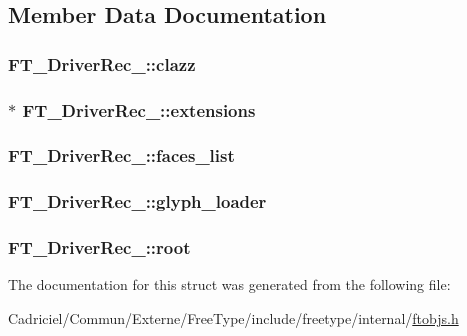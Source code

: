 \subsection{Member Data Documentation}
\hypertarget{struct_f_t___driver_rec___a3111153608e5abeb093ed5eb7fef5aec}{
\subsubsection[{clazz}]{ F\-T\-\_\-\-Driver\-Rec\-\_\-\-::clazz}}\label{struct_f_t___driver_rec___a3111153608e5abeb093ed5eb7fef5aec}
\hypertarget{struct_f_t___driver_rec___ad2f1c1a800723dc887dcbc7ce78203d8}{
\subsubsection[{extensions}]{$\ast$ F\-T\-\_\-\-Driver\-Rec\-\_\-\-::extensions}}\label{struct_f_t___driver_rec___ad2f1c1a800723dc887dcbc7ce78203d8}
\hypertarget{struct_f_t___driver_rec___a2602170e3ecde21a764dc32417aaa002}{
\subsubsection[{faces\-\_\-list}]{ F\-T\-\_\-\-Driver\-Rec\-\_\-\-::faces\-\_\-list}}\label{struct_f_t___driver_rec___a2602170e3ecde21a764dc32417aaa002}
\hypertarget{struct_f_t___driver_rec___ac28e7adbc14ee82c2b7710d0ee5541e2}{
\subsubsection[{glyph\-\_\-loader}]{ F\-T\-\_\-\-Driver\-Rec\-\_\-\-::glyph\-\_\-loader}}\label{struct_f_t___driver_rec___ac28e7adbc14ee82c2b7710d0ee5541e2}
\hypertarget{struct_f_t___driver_rec___a8451ceb25c76794fb47e81f477c8222d}{
\subsubsection[{root}]{ F\-T\-\_\-\-Driver\-Rec\-\_\-\-::root}}\label{struct_f_t___driver_rec___a8451ceb25c76794fb47e81f477c8222d}


The documentation for this struct was generated from the following file\-:\begin{DoxyCompactItemize}
\item 
Cadriciel/\-Commun/\-Externe/\-Free\-Type/include/freetype/internal/\hyperlink{ftobjs_8h}{ftobjs.\-h}\end{DoxyCompactItemize}
